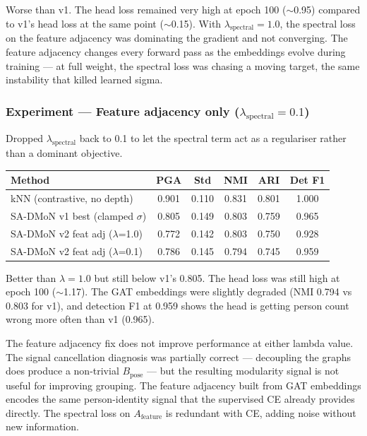 Worse than v1. The head loss remained very high at epoch 100 ($\sim$0.95) compared to v1's head loss at the same point ($\sim$0.15). With $\lambda_{\text{spectral}} = 1.0$, the spectral loss on the feature adjacency was dominating the gradient and not converging. The feature adjacency changes every forward pass as the embeddings evolve during training --- at full weight, the spectral loss was chasing a moving target, the same instability that killed learned sigma.


\subsubsection{Experiment --- Feature adjacency only ($\lambda_{\text{spectral}} = 0.1$)}

Dropped $\lambda_{\text{spectral}}$ back to 0.1 to let the spectral term act as a regulariser rather than a dominant objective.

\begin{center}
\footnotesize
\begin{tabular}{lccccc}
\toprule
Method & PGA & Std & NMI & ARI & Det F1 \\
\midrule
kNN (contrastive, no depth) & 0.901 & 0.110 & 0.831 & 0.801 & 1.000 \\
SA-DMoN v1 best (clamped $\sigma$) & 0.805 & 0.149 & 0.803 & 0.759 & 0.965 \\
SA-DMoN v2 feat adj ($\lambda$=1.0) & 0.772 & 0.142 & 0.803 & 0.750 & 0.928 \\
SA-DMoN v2 feat adj ($\lambda$=0.1) & 0.786 & 0.145 & 0.794 & 0.745 & 0.959 \\
\bottomrule
\end{tabular}
\end{center}

Better than $\lambda = 1.0$ but still below v1's 0.805. The head loss was still high at epoch 100 ($\sim$1.17). The GAT embeddings were slightly degraded (NMI 0.794 vs 0.803 for v1), and detection F1 at 0.959 shows the head is getting person count wrong more often than v1 (0.965).

The feature adjacency fix does not improve performance at either lambda value. The signal cancellation diagnosis was partially correct --- decoupling the graphs does produce a non-trivial $B_{\text{pose}}$ --- but the resulting modularity signal is not useful for improving grouping. The feature adjacency built from GAT embeddings encodes the same person-identity signal that the supervised CE already provides directly. The spectral loss on $A_{\text{feature}}$ is redundant with CE, adding noise without new information.


